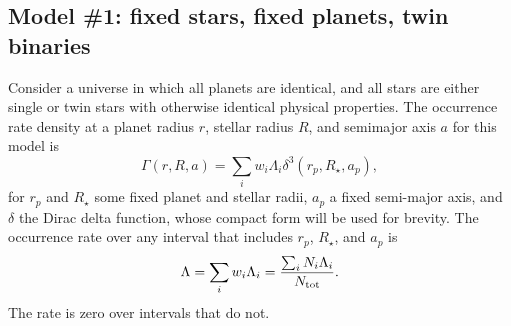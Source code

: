 \subsection{Model \#1: fixed stars, fixed planets, twin binaries}
\label{sec:model_1}

Consider a universe in which all planets are identical, and all stars are 
either single or twin stars with otherwise identical physical properties.
The occurrence rate density at a planet radius $r$, stellar radius $R$, and 
semimajor axis $a$ for this model is
\begin{equation}
\Gamma(r,R,a) = \sum_i w_i \Lambda_i \delta^3(r_p,R_\star,a_p),
\label{eq:model1_occ_rate_density}
\end{equation}
for $r_p$ and $R_\star$ some fixed planet and stellar radii, $a_p$ a fixed 
semi-major axis, and $\delta$ the Dirac delta function, whose compact
form will be used for brevity.
The occurrence rate over any interval that includes $r_p$, $R_\star$, and 
$a_p$ is
\begin{equation}
\Lambda = \sum_i w_i \Lambda_i = \frac{ \sum_i N_i \Lambda_i }{N_{\rm tot}}.
\end{equation}
The rate is zero over intervals that do not.


